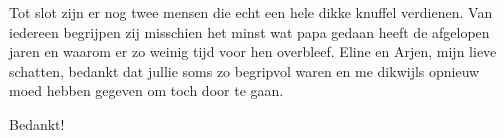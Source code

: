 \begin{preface}
Tot slot zijn er nog twee mensen die echt een hele dikke knuffel verdienen. Van
iedereen begrijpen zij misschien het minst wat papa gedaan heeft de afgelopen
jaren en waarom er zo weinig tijd voor hen overbleef. Eline en Arjen, mijn
lieve schatten, bedankt dat jullie soms zo begripvol waren en me dikwijls
opnieuw moed hebben gegeven om toch door te gaan.

\bigskip

Bedankt!

\end{preface}
